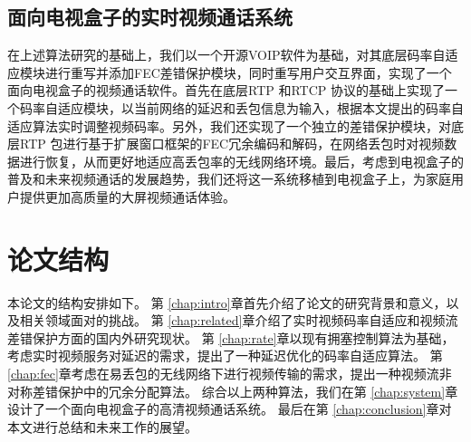 \subsection{面向电视盒子的实时视频通话系统}
在上述算法研究的基础上，我们以一个开源VOIP软件为基础，对其底层码率自适应模块进行重写并添加FEC差错保护模块，同时重写用户交互界面，实现了一个面向电视盒子的视频通话软件。首先在底层RTP 和RTCP 协议的基础上实现了一个码率自适应模块，以当前网络的延迟和丢包信息为输入，根据本文提出的码率自适应算法实时调整视频码率。另外，我们还实现了一个独立的差错保护模块，对底层RTP 包进行基于扩展窗口框架的FEC冗余编码和解码，在网络丢包时对视频数据进行恢复，从而更好地适应高丢包率的无线网络环境。最后，考虑到电视盒子的普及和未来视频通话的发展趋势，我们还将这一系统移植到电视盒子上，为家庭用户提供更加高质量的大屏视频通话体验。

\section{论文结构}
本论文的结构安排如下。
第 \ref{chap:intro}章首先介绍了论文的研究背景和意义，以及相关领域面对的挑战。
第 \ref{chap:related}章介绍了实时视频码率自适应和视频流差错保护方面的国内外研究现状。
第 \ref{chap:rate}章以现有拥塞控制算法为基础，考虑实时视频服务对延迟的需求，提出了一种延迟优化的码率自适应算法。
第 \ref{chap:fec}章考虑在易丢包的无线网络下进行视频传输的需求，提出一种视频流非对称差错保护中的冗余分配算法。
综合以上两种算法，我们在第 \ref{chap:system}章设计了一个面向电视盒子的高清视频通话系统。
最后在第 \ref{chap:conclusion}章对本文进行总结和未来工作的展望。
